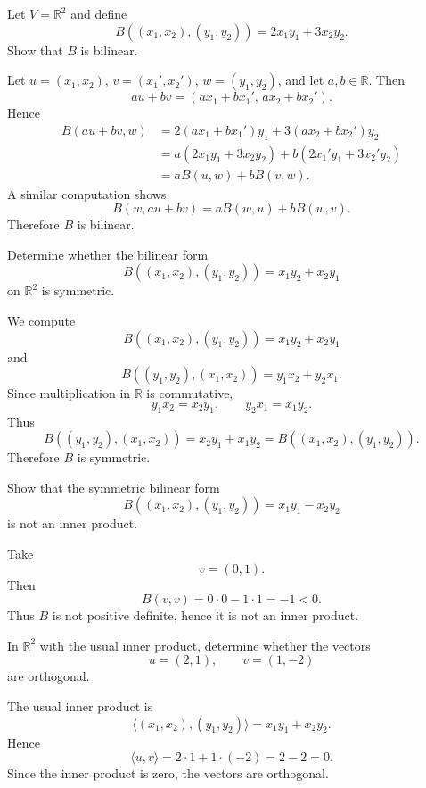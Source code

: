 \documentclass{article}
\begin{document}
\begin{exercise}
Let $V=\mathbb{R}^2$ and define
$$
B((x_1,x_2),(y_1,y_2))=2x_1y_1+3x_2y_2.
$$
Show that $B$ is bilinear.
\end{exercise}

\begin{solution}
Let $u=(x_1,x_2)$, $v=(x_1',x_2')$, $w=(y_1,y_2)$, and let $a,b\in\mathbb{R}$. Then
$$
au+bv=(ax_1+bx_1',\,ax_2+bx_2').
$$
Hence
\begin{align*}
B(au+bv,w)
&=2(ax_1+bx_1')y_1+3(ax_2+bx_2')y_2\\
&=a(2x_1y_1+3x_2y_2)+b(2x_1'y_1+3x_2'y_2)\\
&=aB(u,w)+bB(v,w).
\end{align*}
A similar computation shows
$$
B(w,au+bv)=aB(w,u)+bB(w,v).
$$
Therefore $B$ is bilinear.
\end{solution}

\begin{exercise}
Determine whether the bilinear form
$$
B((x_1,x_2),(y_1,y_2))=x_1y_2+x_2y_1
$$
on $\mathbb{R}^2$ is symmetric.
\end{exercise}

\begin{solution}
We compute
$$
B((x_1,x_2),(y_1,y_2))=x_1y_2+x_2y_1
$$
and
$$
B((y_1,y_2),(x_1,x_2))=y_1x_2+y_2x_1.
$$
Since multiplication in $\mathbb{R}$ is commutative,
$$
y_1x_2=x_2y_1,\qquad y_2x_1=x_1y_2.
$$
Thus
$$
B((y_1,y_2),(x_1,x_2))=x_2y_1+x_1y_2=B((x_1,x_2),(y_1,y_2)).
$$
Therefore $B$ is symmetric.
\end{solution}

\begin{exercise}
Show that the symmetric bilinear form
$$
B((x_1,x_2),(y_1,y_2))=x_1y_1-x_2y_2
$$
is not an inner product.
\end{exercise}

\begin{solution}
Take
$$
v=(0,1).
$$
Then
$$
B(v,v)=0\cdot 0-1\cdot 1=-1<0.
$$
Thus $B$ is not positive definite, hence it is not an inner product.
\end{solution}

\begin{exercise}
In $\mathbb{R}^2$ with the usual inner product, determine whether the vectors
$$
u=(2,1),\qquad v=(1,-2)
$$
are orthogonal.
\end{exercise}

\begin{solution}
The usual inner product is
$$
\langle (x_1,x_2),(y_1,y_2)\rangle=x_1y_1+x_2y_2.
$$
Hence
$$
\langle u,v\rangle=2\cdot 1+1\cdot(-2)=2-2=0.
$$
Since the inner product is zero, the vectors are orthogonal.
\end{solution}
\end{document}
